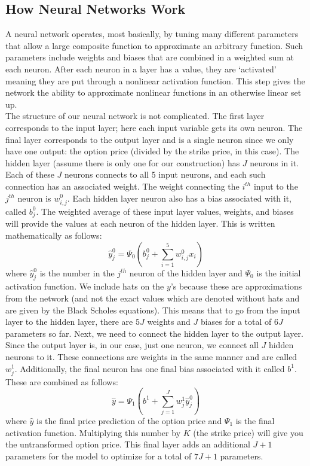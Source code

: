 \documentclass[reqno,14pt]{amsart}
\theoremstyle{plain}
\theoremstyle{definition}
\theoremstyle{remark}
\begin{document}
\subsection{How Neural Networks Work}
A neural network operates, most basically, by tuning many different parameters that allow a large composite function to approximate an arbitrary function. Such parameters include weights and biases that are combined in a weighted sum at each neuron. After each neuron in a layer has a value, they are `activated' meaning they are put through a nonlinear activation function. This step gives the network the ability to approximate nonlinear functions in an otherwise linear set up.\\
The structure of our neural network is not complicated. The first layer corresponds to the input layer; here each input variable gets its own neuron. The final layer corresponds to the output layer and is a single neuron since we only have one output: the option price (divided by the strike price, in this case). The hidden layer (assume there is only one for our construction) has $J$ neurons in it. Each of these $J$ neurons connects to all 5 input neurons, and each such connection has an associated weight. The weight connecting the $i^{th}$ input to the $j^{th}$ neuron is $w^0_{i,j}$. Each hidden layer neuron also has a bias associated with it, called $b^0_j$. The weighted average of these input layer values, weights, and biases will provide the values at each neuron of the hidden layer. This is written mathematically as follows: 
\begin{equation}
    \hat{y}^0_j = \Psi_0( b^0_j + \sum^5_{i=1} w^0_{i,j} x_i )
\end{equation}
where $\hat{y}^0_j$ is the number in the $j^{th}$ neuron of the hidden layer and $\Psi_0$ is the initial activation function. We include hats on the $y$'s because these are approximations from the network (and not the exact values which are denoted without hats and are given by the Black Scholes equations). This means that to go from the input layer to the hidden layer, there are $5J$ weights and $J$ biases for a total of $6J$ parameters so far. Next, we need to connect the hidden layer to the output layer. Since the output layer is, in our case, just one neuron, we connect all $J$ hidden neurons to it. These connections are weights in the same manner and are called $w^1_j$. Additionally, the final neuron has one final bias associated with it called $b^1$. These are combined as follows: 
\begin{equation}
    \hat{y} = \Psi_1( b^1 + \sum^J_{j=1} w^1_j \hat{y}^0_j )
\end{equation}
where $\hat{y}$ is the final price prediction of the option price and $\Psi_1$ is the final activation function. Multiplying this number by $K$ (the strike price) will give you the untransformed option price. This final layer adds an additional $J+1$ parameters for the model to optimize for a total of $7J+1$ parameters.\\
\end{document}
